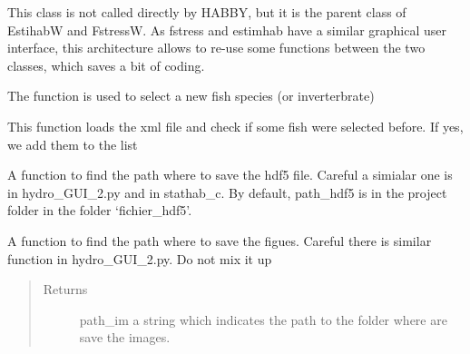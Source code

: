 \documentclass[letterpaper,10pt,english]{sphinxmanual}
\begin{document}
\begin{fulllineitems}
\label{\detokenize{index:src_GUI.estimhab_GUI.StatModUseful}}
This class is not called directly by HABBY, but it is the parent class of EstihabW and FstressW. As fstress and
estimhab have a similar graphical user interface, this architecture allows to re-use some functions between the
two classes, which saves a bit of coding.

\begin{fulllineitems}
\label{\detokenize{index:src_GUI.estimhab_GUI.StatModUseful.add_fish}}
The function is used to select a new fish species (or inverterbrate)

\end{fulllineitems}


\begin{fulllineitems}
\label{\detokenize{index:src_GUI.estimhab_GUI.StatModUseful.add_sel_fish}}
This function loads the xml file and check if some fish were selected before. If yes, we add them to the list

\end{fulllineitems}


\begin{fulllineitems}
\label{\detokenize{index:src_GUI.estimhab_GUI.StatModUseful.find_path_hdf5_est}}
A function to find the path where to save the hdf5 file. Careful a simialar one is in hydro\_GUI\_2.py and in
stathab\_c. By default, path\_hdf5 is in the project folder in the folder `fichier\_hdf5'.

\end{fulllineitems}


\begin{fulllineitems}
\label{\detokenize{index:src_GUI.estimhab_GUI.StatModUseful.find_path_im_est}}
A function to find the path where to save the figues. Careful there is similar function in hydro\_GUI\_2.py.
Do not mix it up
\begin{quote}\begin{description}
\item[{Returns}] \leavevmode
path\_im a string which indicates the path to the folder where are save the images.


\end{description}
\end{quote}
\end{fulllineitems}
\end{fulllineitems}
\end{document}

